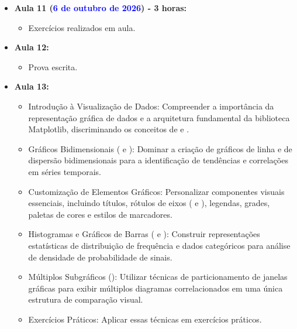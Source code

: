 \begin{itemize}
    \item \textbf{Aula 11 (\textcolor{blue}{6 de outubro de 2026}) - 3 horas:}
    \begin{itemize}\justifying
        \item Exercícios realizados em aula.
    \end{itemize}

    \item \textbf{Aula 12:}
    \begin{itemize}
        \item Prova escrita. 
    \end{itemize}

    \item \textbf{Aula 13:}
    \begin{itemize}\justifying
        \item Introdução à Visualização de Dados: Compreender a importância da representação gráfica de dados e a arquitetura fundamental da biblioteca Matplotlib, discriminando os conceitos de  e .
        \item Gráficos Bidimensionais ( e ): Dominar a criação de gráficos de linha e de dispersão bidimensionais para a identificação de tendências e correlações em séries temporais.
        \item Customização de Elementos Gráficos: Personalizar componentes visuais essenciais, incluindo títulos, rótulos de eixos ( e ), legendas, grades, paletas de cores e estilos de marcadores.
        \item Histogramas e Gráficos de Barras ( e ): Construir representações estatísticas de distribuição de frequência e dados categóricos para análise de densidade de probabilidade de sinais.
        \item Múltiplos Subgráficos (): Utilizar técnicas de particionamento de janelas gráficas para exibir múltiplos diagramas correlacionados em uma única estrutura de comparação visual.
        \item Exercícios Práticos: Aplicar essas técnicas em exercícios práticos.

    \end{itemize}



\end{itemize}
